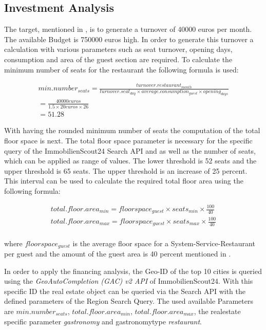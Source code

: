 \subsection{Investment Analysis}
\label{subsec:moneten}
The target, mentioned in , is to generate a turnover of 40000 euros per month. The available Budget
 is 750000 euros high. In order to generate this turnover a calculation with various parameters such as seat turnover,
 opening days, consumption and area of the guest section are required. To calculate the minimum number of seats for the
 restaurant the following formula is used:
\begin{center}
\begin{equation}
\begin{aligned}
	min.number_{seats} = \frac{turnover.restaurant_{month}}{turnover.seat_{day} \times average.consumption_{guest} \times opening_{days}} \\
	= \frac{40000 euros}{1.5 \times 20 euros \times 26} \\
	= 51.28
\end{aligned}
\label{eq:number_seats_benchmark}
\end{equation}
\end{center}

With having the rounded minimum number of seats the computation of the total floor space is next. The total
 floor space parameter is necessary for the specific query of the ImmobilienScout24 Search API \cite{ImmoScout} and as
 well as the number of seats, which can be applied as range of values. The lower threshold is 52 seats and the upper
 threshold is 65 seats. The upper threshold is an increase of 25 percent. This interval can be used to calculate the
 required total floor area using the following formula:

\begin{equation}
\begin{aligned}
	total.floor.area_{min} = floorspace_{guest} \times seats_{min} \times \frac{100}{40} \\
	total.floor.area_{max} = floorspace_{guest} \times seats_{max} \times \frac{100}{40} \\
\end{aligned}
\label{eq:total_floor_space}
\end{equation}

where $floorspace_{guest}$ is the average floor space for a System-Service-Restaurant per guest \cite{FlaecheGast} and the
 amount of the guest area is 40 percent mentioned in \cite{FlaecheGastronomie}.

In order to apply the financing analysis, the Geo-ID of the top 10 cities is queried using the \textit{GeoAutoCompletion (GAC)
 v2 \ac{API}} of ImmobilienScout24. With this specific ID the real estate object can be queried via the Search \ac{API}
 with the defined parameters of the Region Search Query. The used available Parameters are $min.number_{seats}$, $total.floor.area_{min}$,
 $total.floor.area_{max}$, the realestate specific parameter \textit{gastronomy} and gastronomytype \textit{restaurant}.


